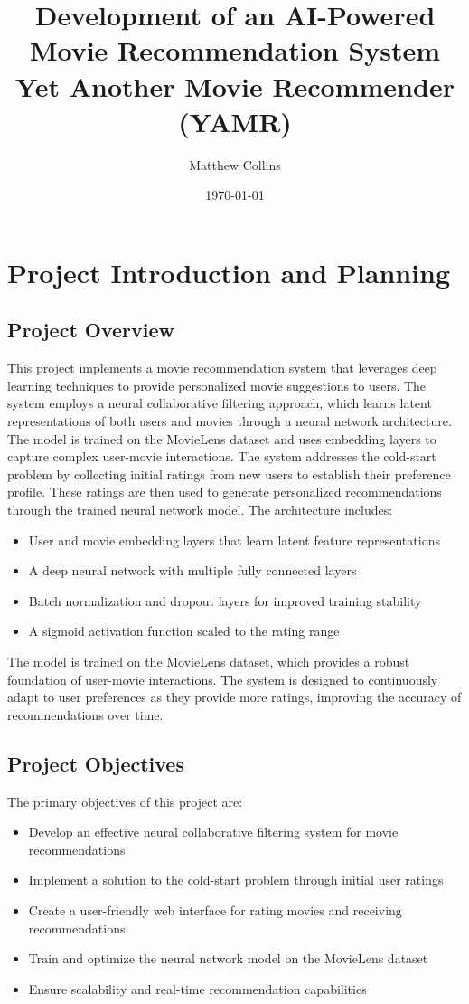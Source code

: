 \documentclass[12pt]{article}
\title{Development of an AI-Powered Movie Recommendation System\\[0.5em]
\large Yet Another Movie Recommender (YAMR)}
\author{Matthew Collins}
\date{\today}
\begin{document}
\maketitle

\section{Project Introduction and Planning}

\subsection{Project Overview}
This project implements a movie recommendation system that leverages deep learning techniques to provide personalized movie suggestions to users. The system employs a neural collaborative filtering approach, which learns latent representations of both users and movies through a neural network architecture. The model is trained on the MovieLens dataset and uses embedding layers to capture complex user-movie interactions.
The system addresses the cold-start problem by collecting initial ratings from new users to establish their preference profile. These ratings are then used to generate personalized recommendations through the trained neural network model. The architecture includes:
\begin{itemize}
    \item User and movie embedding layers that learn latent feature representations
    \item A deep neural network with multiple fully connected layers
    \item Batch normalization and dropout layers for improved training stability
    \item A sigmoid activation function scaled to the rating range
\end{itemize}
The model is trained on the MovieLens dataset, which provides a robust foundation of user-movie interactions. The system is designed to continuously adapt to user preferences as they provide more ratings, improving the accuracy of recommendations over time.
\subsection{Project Objectives}
The primary objectives of this project are:
\begin{itemize}
    \item Develop an effective neural collaborative filtering system for movie recommendations
    \item Implement a solution to the cold-start problem through initial user ratings
    \item Create a user-friendly web interface for rating movies and receiving recommendations
    \item Train and optimize the neural network model on the MovieLens dataset
    \item Ensure scalability and real-time recommendation capabilities
\end{itemize}
\clearpage
{}
\end{document}
